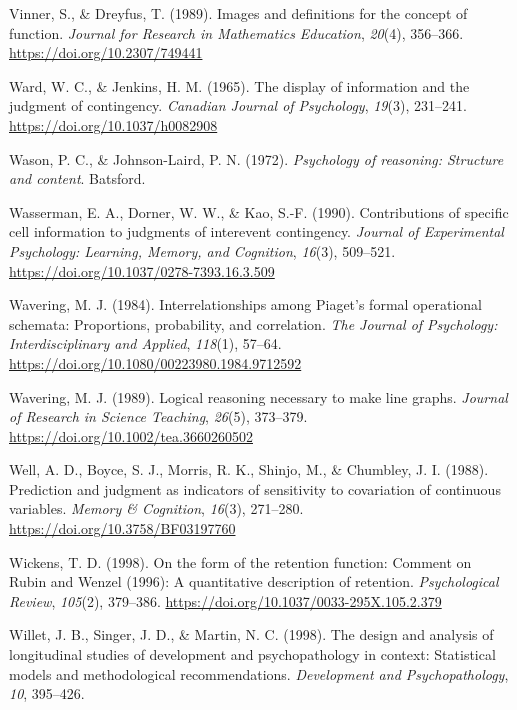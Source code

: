 \documentclass[11pt]{umnthesis}
\newlength{\cslhangindent}
\newenvironment{CSLReferences}[2] %
 {%
  \setlength{\parindent}{0pt}
  \ifodd #1 \everypar{\setlength{\hangindent}{\cslhangindent}}\ignorespaces\fi
  \ifnum #2 > 0
  \setlength{\parskip}{#2\baselineskip}
  \fi
 }%
 {}
\begin{document}
\begin{CSLReferences}{1}{0}
\leavevmode{}%
Vinner, S., \& Dreyfus, T. (1989). Images and definitions for the concept of function. \emph{Journal for Research in Mathematics Education}, \emph{20}(4), 356--366. \url{https://doi.org/10.2307/749441}

\leavevmode{}%
Ward, W. C., \& Jenkins, H. M. (1965). The display of information and the judgment of contingency. \emph{Canadian Journal of Psychology}, \emph{19}(3), 231--241. \url{https://doi.org/10.1037/h0082908}

\leavevmode{}%
Wason, P. C., \& Johnson-Laird, P. N. (1972). \emph{Psychology of reasoning: Structure and content}. Batsford.

\leavevmode{}%
Wasserman, E. A., Dorner, W. W., \& Kao, S.-F. (1990). Contributions of specific cell information to judgments of interevent contingency. \emph{Journal of Experimental Psychology: Learning, Memory, and Cognition}, \emph{16}(3), 509--521. \url{https://doi.org/10.1037/0278-7393.16.3.509}

\leavevmode{}%
Wavering, M. J. (1984). Interrelationships among {P}iaget's formal operational schemata: Proportions, probability, and correlation. \emph{The Journal of Psychology: Interdisciplinary and Applied}, \emph{118}(1), 57--64. \url{https://doi.org/10.1080/00223980.1984.9712592}

\leavevmode{}%
Wavering, M. J. (1989). Logical reasoning necessary to make line graphs. \emph{Journal of Research in Science Teaching}, \emph{26}(5), 373--379. \url{https://doi.org/10.1002/tea.3660260502}

\leavevmode{}%
Well, A. D., Boyce, S. J., Morris, R. K., Shinjo, M., \& Chumbley, J. I. (1988). Prediction and judgment as indicators of sensitivity to covariation of continuous variables. \emph{Memory \& Cognition}, \emph{16}(3), 271--280. \url{https://doi.org/10.3758/BF03197760}

\leavevmode{}%
Wickens, T. D. (1998). On the form of the retention function: Comment on {R}ubin and {W}enzel (1996): A quantitative description of retention. \emph{Psychological Review}, \emph{105}(2), 379--386. \url{https://doi.org/10.1037/0033-295X.105.2.379}

\leavevmode{}%
Willet, J. B., Singer, J. D., \& Martin, N. C. (1998). The design and analysis of longitudinal studies of development and psychopathology in context: Statistical models and methodological recommendations. \emph{Development and Psychopathology}, \emph{10}, 395--426.


\end{CSLReferences}
\end{document}

